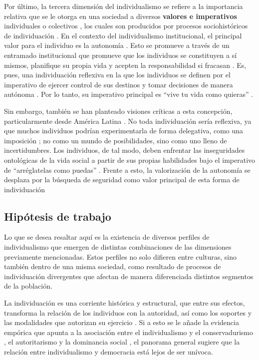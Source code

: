 \documentclass[12pt,twoside]{templates/facsothesis}
\begin{document}
Por último, la tercera dimensión del individualismo se refiere a la importancia relativa que se le otorga en una sociedad a diversos \textbf{valores e imperativos} individuales o colectivos \citep{brewer2007}, los cuales son producidos por procesos sociohistóricos de individuación \citep{martuccelli2018}. En el contexto del individualismo institucional, el principal valor para el individuo es la autonomía \citep{martuccelli2010}. Esto se promueve a través de un entramado institucional \citep{martuccelli2018} que promueve que los individuos se constituyen a sí mismos, planifique su propia vida y acepten la responsabilidad si fracasan \citep{robles2001}. Es, pues, una individuación reflexiva en la que los individuos se definen por el imperativo de ejercer control de sus destinos y tomar decisiones de manera autónoma \citep{silvapalacios2015}. Por lo tanto, su imperativo principal es ``vive tu vida como quieras'' \citep{robles2001}.

Sin embargo, también se han planteado visiones críticas a esta concepción, particularmente desde América Latina \citep{araujo2012, robles2001}. No toda individuación sería reflexiva, ya que muchos individuos podrían experimentarla de forma delegativa, como una imposición \citep{silvapalacios2015}; no como un mundo de posibilidades, sino como uno lleno de incertidumbres. Los individuos, de tal modo, deben enfrentar las inseguridades ontológicas de la vida social a partir de sus propias habilidades bajo el imperativo de ``arréglatelas como puedas'' \citep{araujo2014, robles2001}. Frente a esto, la valorización de la autonomía se desplaza por la búsqueda de seguridad como valor principal de esta forma de individuación \citep{silvapalacios2015}

\hypertarget{hipuxf3tesis-de-trabajo}{%
\subsection*{Hipótesis de trabajo}\label{hipuxf3tesis-de-trabajo}}

Lo que se desea resaltar aquí es la existencia de diversos perfiles de individualismo que emergen de distintas combinaciones de las dimensiones previamente mencionadas. Estos perfiles no solo difieren entre culturas, sino también dentro de una misma sociedad, como resultado de procesos de individuación divergentes que afectan de manera diferenciada distintos segmentos de la población.

La individuación es una corriente histórica y estructural, que entre sus efectos, transforma la relación de los individuos con la autoridad, así como los soportes y las modalidades que autorizan su ejercicio \citep{araujo2021}. Si a esto se le añade la evidencia empórica que apunta a la asociación entre el individualismo y el conservadurismo \citep{zhang2009}, el autoritarismo \citep{kemmelmeier2003} y la dominancia social \citep{strunk1999}, el panorama general sugiere que la relación entre individualismo y democracia está lejos de ser unívoca.
\end{document}

